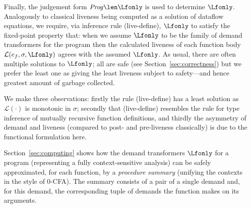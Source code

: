 Finally, the judgement form $\mathit{Prog} \len \Lfonly$ is used to determine $\Lfonly$\@.
Analogously to classical liveness being computed as
a solution of dataflow equations, we require, via inference rule ({\sc live-define}),
$\Lfonly$ to satisfy the fixed-point property that:
 when we assume $\Lfonly$ to be the family of demand transformers for the program
 then the calculated liveness of each function body $\mathcal{L}(e_f,\sigma,\Lfonly)$ agrees
 with the assumed  $\Lfonly$.
As usual, there are often multiple solutions to $\Lfonly$; all are safe
(see Section~\ref{sec:correctness})
but we prefer the least one as giving the least liveness subject to safety---and
hence greatest amount of garbage collected.

We make three observations: firstly the rule ({\sc live-define}) has a least solution
as $\mathcal{L}(\cdot)$ is monotonic in $\sigma$; secondly that
({\sc live-define})
resembles the rule for type inference of mutually recursive function definitions,
and thirdly the asymmetry of demand and liveness (compared to post- and pre-liveness
classically) is due to the functional formulation here.

Section~\ref{sec:computing} shows how the demand transformers $\Lfonly$ for a program
(representing a fully context-sensitive analysis)
can be safely approximated, for each function, by a {\em procedure summary}
(unifying the contexts in the style of 0-CFA)\@.
The summary consists of a pair of a single demand and, for this demand,
the corresponding tuple of demands the function makes on its arguments.





